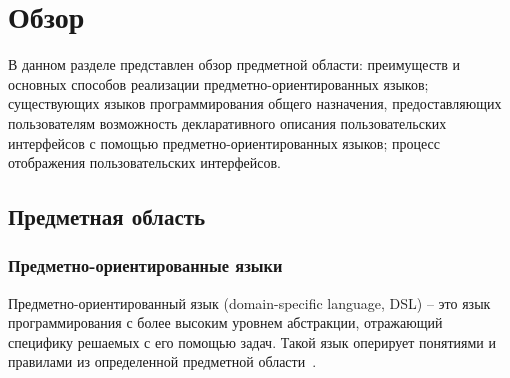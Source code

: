 \section{Обзор}
В данном разделе представлен обзор предметной области: преимуществ и
основных способов реализации предметно-ориентированных языков; существующих
языков программирования общего назначения, предоставляющих
пользователям возможность декларативного описания пользовательских интерфейсов с помощью предметно-ориентированных языков; процесс отображения
пользовательских интерфейсов.

\subsection{Предметная область}
\subsubsection{Предметно-ориентированные языки}
Предметно-ориентированный язык (domain-specific language, DSL) -- это язык
программирования с более высоким уровнем абстракции, отражающий специфику
решаемых с его помощью задач.
Такой язык оперирует понятиями и правилами из определенной предметной
области~\cite{book-of-dsls}.

